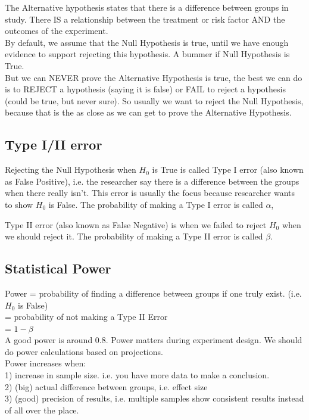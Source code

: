 The Alternative hypothesis states that there is a difference between groups in study. There IS a relationship between the treatment or risk factor AND the outcomes of the experiment.\\

By default, we assume that the Null Hypothesis is true, until we have enough evidence to support rejecting this hypothesis. A bummer if Null Hypothesis is True. \\

But we can NEVER prove the Alternative Hypothesis is true, the best we can do is to REJECT a hypothesis (saying it is false) or FAIL to reject a hypothesis (could be true, but never sure). So usually we want to reject the Null Hypothesis, because that is the as close as we can get to prove the Alternative Hypothesis.

\subsection{Type I/II error}

Rejecting the Null Hypothesis when $H_0$ is True is called Type I error (also known as False Positive), i.e. the researcher say there is a difference between the groups when there really isn't. This error is usually the focus because researcher wants to show $H_0$ is False. The probability of making a Type I error is called $\alpha$, 

Type II error (also known as False Negative) is when we failed to reject $H_0$ when we should reject it. The probability of making a Type II error is called $\beta$. 

\subsection{Statistical Power}

Power = probability of finding a difference between groups if one truly exist. (i.e. $H_0$ is False)\\
= probability of not making a Type II Error \\
= $1 - \beta$\\

A good power is around 0.8. Power matters during experiment design. We should do power calculations based on projections.\\

Power increases when:\\
1) increase in sample size. i.e. you have more data to make a conclusion.\\
2) (big) actual difference between groups, i.e. effect size\\
3) (good) precision of results, i.e. multiple samples show consistent results instead of all over the place.\\

